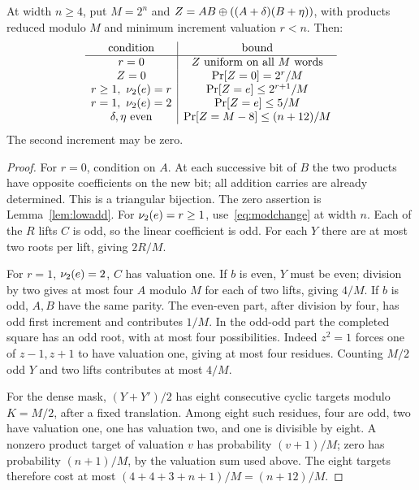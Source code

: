 \begin{lemma}\label{lem:truncated}
At width $n\ge4$, put $M=2^n$ and $Z=AB\mathbin\oplus((A+\delta)(B+\eta))$, with products reduced modulo $M$ and minimum increment valuation $r<n$. Then:
\[
\begin{array}{c|c}
\text{condition}&\text{bound}\\\hline
r=0&Z\text{ uniform on all }M\text{ words}\\
Z=0&\mathop{\rm Pr}[Z=0]=2^r/M\\
r\ge1,\ \nu_2(e)=r&\mathop{\rm Pr}[Z=e]\le2^{r+1}/M\\
r=1,\ \nu_2(e)=2&\mathop{\rm Pr}[Z=e]\le5/M\\
\delta,\eta\text{ even}&\mathop{\rm Pr}[Z=M-8]\le(n+12)/M
\end{array}
\]
The second increment may be zero.
\end{lemma}
\begin{proof}
For $r=0$, condition on $A$. At each successive bit of $B$ the two products have opposite coefficients on the new bit; all addition carries are already determined. This is a triangular bijection. The zero assertion is Lemma~\ref{lem:lowadd}. For $\nu_2(e)=r\ge1$, use~\eqref{eq:modchange} at width $n$. Each of the $R$ lifts $C$ is odd, so the linear coefficient is odd. For each $Y$ there are at most two roots per lift, giving $2R/M$.

For $r=1$, $\nu_2(e)=2$, $C$ has valuation one. If $b$ is even, $Y$ must be even; division by two gives at most four $A$ modulo $M$ for each of two lifts, giving $4/M$. If $b$ is odd, $A,B$ have the same parity. The even-even part, after division by four, has odd first increment and contributes $1/M$. In the odd-odd part the completed square has an odd root, with at most four possibilities. Indeed $z^2=1$ forces one of $z-1,z+1$ to have valuation one, giving at most four residues. Counting $M/2$ odd $Y$ and two lifts contributes at most $4/M$.

For the dense mask, $(Y+Y')/2$ has eight consecutive cyclic targets modulo $K=M/2$, after a fixed translation. Among eight such residues, four are odd, two have valuation one, one has valuation two, and one is divisible by eight. A nonzero product target of valuation $v$ has probability $(v+1)/M$; zero has probability $(n+1)/M$, by the valuation sum used above. The eight targets therefore cost at most $(4+4+3+n+1)/M=(n+12)/M$.
\end{proof}

